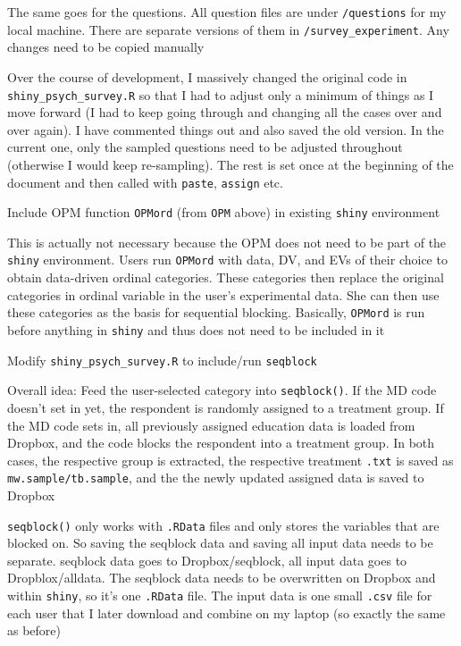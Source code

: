 \begin{coi}
		\item The same goes for the questions. All question files are under {\tt /questions} for my local machine. There are separate versions of them in {\tt /survey\_experiment}. Any changes need to be copied manually
		\item Over the course of development, I massively changed the original code in \\{\tt shiny\_psych\_survey.R} so that I had to adjust only a minimum of things as I move forward (I had to keep going through and changing all the cases over and over again). I have commented things out and also saved the old version. In the current one, only the sampled questions need to be adjusted throughout (otherwise I would keep re-sampling). The rest is set once at the beginning of the document and then called with {\tt paste}, {\tt assign} etc.
		\item Include OPM function \texttt{OPMord} (from \texttt{OPM} above) in existing \texttt{shiny} environment
			\begin{coi}
				\item This is actually not necessary because the OPM does not need to be part of the \texttt{shiny} environment. Users run \texttt{OPMord} with data, DV, and EVs of their choice to obtain data-driven ordinal categories. These categories then replace the original categories in ordinal variable in the user's experimental data. She can then use these categories as the basis for sequential blocking. Basically, \texttt{OPMord} is run before anything in \texttt{shiny} and thus does not need to be included in it
			\end{coi}
		\item Modify \texttt{shiny\_psych\_survey.R} to include/run \texttt{seqblock}
			\begin{coi}
				\item Overall idea: 	Feed the user-selected category into \texttt{seqblock()}. If the MD code doesn't set in yet, the respondent is randomly assigned to a treatment group. If the MD code sets in, all previously assigned education data is loaded from Dropbox, and the code blocks the respondent into a treatment group. In both cases, the respective group is extracted, the respective treatment \texttt{.txt} is saved as \texttt{mw.sample/tb.sample}, and the the newly updated assigned data is saved to Dropbox
				\item \texttt{seqblock()} only works with \texttt{.RData} files and only stores the variables that are blocked on. So saving the seqblock data and saving all input data needs to be separate. seqblock data goes to Dropbox/seqblock, all input data goes to Dropblox/alldata. The seqblock data needs to be overwritten on Dropbox and within \texttt{shiny}, so it's one \texttt{.RData} file. The input data is one small \texttt{.csv} file for each user that I later download and combine on my laptop (so exactly the same as before)

\end{coi}
\end{coi}
